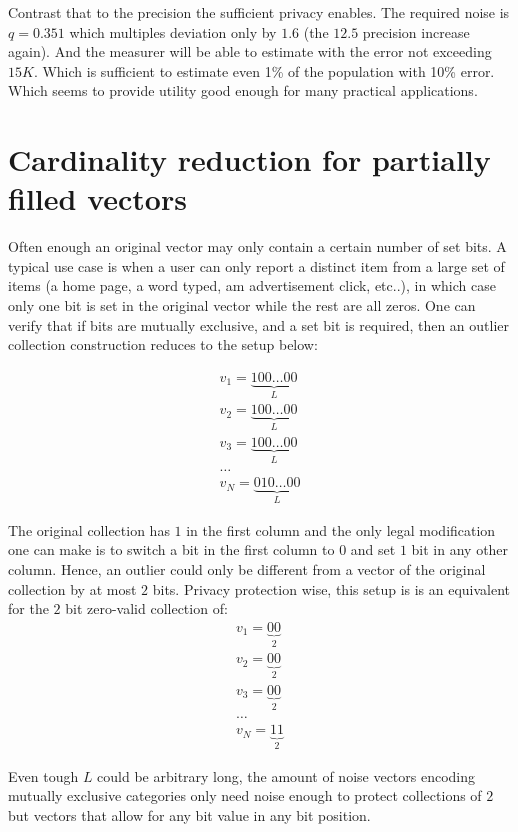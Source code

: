 \documentclass[11pt]{article}
\begin{document}
Contrast that to the precision the sufficient privacy enables.  The required noise is $q=0.351$ which multiples deviation only by $1.6$ (the $12.5$ precision increase again).  And the measurer will be able to estimate with the error not exceeding $15K$.  Which is  sufficient to estimate even 1\% of the population with 10\% error.  Which seems to provide utility good enough for  many practical applications.

\section{Cardinality reduction for partially filled vectors}

Often enough an original vector may only contain a certain number of set bits.  A typical use case is when a user can only report a distinct item from a large set of items (a home page, a word typed, am advertisement click, etc..), in which case only one bit is set in the original vector while the rest are all zeros.   One can verify that if bits are mutually exclusive, and a set bit is required, then an outlier collection construction reduces to the setup below:

\begin{align}
v_1 = \underset{L}{\underbrace{100 \dots 00}} \\
v_2 = \underset{L}{\underbrace{100 \dots 00}} \\
v_3 = \underset{L}{\underbrace{100 \dots 00}} \\
\dots \\
v_{N} =  \underset{L}{\underbrace{010 \dots 00}} 
\end{align}

The original collection has $1$ in the first column and the only legal modification one can make is to switch a bit in the first column to $0$ and set $1$ bit in any other column.  Hence, an outlier could only be different from a vector of the original collection by at most $2$ bits.  Privacy protection wise, this setup is is an equivalent for the $2$ bit zero-valid collection of:
\begin{align}
v_1 = \underset{2}{\underbrace{00}} \\
v_2 = \underset{2}{\underbrace{00}} \\
v_3 = \underset{2}{\underbrace{00}} \\
\dots \\
v_{N} =  \underset{2}{\underbrace{11}} 
\end{align}

Even tough $L$ could be arbitrary long, the amount of noise vectors encoding mutually exclusive categories only need noise enough to protect collections of $2$ but vectors that allow for any bit value in any bit position.
\end{document}
